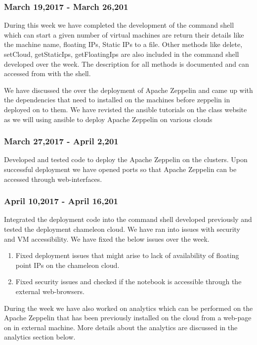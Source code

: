 \documentclass[9pt,twocolumn,twoside]{../../styles/osajnl}
\begin{document}
	\subsubsection{March 19,2017 - March 26,201}
	
	During this week we have completed the development of the command 
	shell which can start a given number of virtual machines are 
	return 
	their details like the machine name, floating IPs, Static IPs to 
	a 
	file. Other methods like delete, setCloud, getStaticIps, 
	getFloatingIps are also included in the command shell developed 
	over 
	the week.  The description for all methods is documented and can 
	accessed from with the shell.
	
	We have discussed the over the deployment of Apache Zeppelin and 
	came 
	up with the dependencies that need to installed on the machines 
	before zeppelin in deployed on to them. We have revisted the 
	ansible 
	tutorials on the class website as we will using ansible to deploy 
	Apache Zeppelin on various clouds
	
	\subsubsection{March 27,2017 - April 2,201}
	
	Developed and tested code to deploy the Apache Zeppelin on the 
	clusters. Upon successful deployment we have opened ports so that 
	Apache Zeppelin can be accessed through web-interfaces.
	
	\subsubsection{April 10,2017 - April 16,201}
	
	Integrated the deployment code into the command shell developed 
	previously and tested the deployment chameleon cloud. We have ran 
	into issues with security and VM accessibility. We have fixed the 
	below issues over the week.
	\begin{enumerate}
		\item Fixed deployment issues that might arise to lack of 
		availability of  floating point IPs on the chameleon cloud. 
		\item Fixed security issues and checked if the notebook is 
		accessible through the external web-browsers.
	\end{enumerate}
	
	During the week we have also worked on analytics which can be 
	performed on the Apache Zeppelin that has been previously 
	installed 
	on the cloud from a web-page on in external machine. More details 
	about the analytics are discussed in the analytics section below.
	
\end{document}

